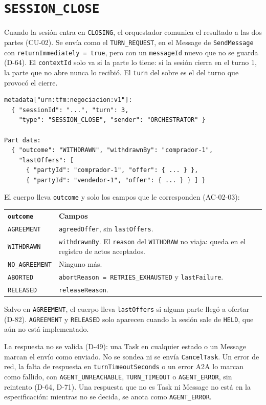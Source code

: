 \section{\texttt{SESSION\_CLOSE}}

Cuando la sesión entra en \texttt{CLOSING}, el orquestador comunica el resultado a las dos partes (CU-02). Se envía como el \texttt{TURN\_REQUEST}, en el Message de \texttt{SendMessage} con \texttt{returnImmediately = true}, pero con un \texttt{messageId} nuevo que no se guarda (D-64). El \texttt{contextId} solo va si la parte lo tiene: si la sesión cierra en el turno 1, la parte que no abre nunca lo recibió. El \texttt{turn} del sobre es el del turno que provocó el cierre.

\begin{verbatim}
metadata["urn:tfm:negociacion:v1"]:
  { "sessionId": "...", "turn": 3,
    "type": "SESSION_CLOSE", "sender": "ORCHESTRATOR" }

Part data:
  { "outcome": "WITHDRAWN", "withdrawnBy": "comprador-1",
    "lastOffers": [
      { "partyId": "comprador-1", "offer": { ... } },
      { "partyId": "vendedor-1", "offer": { ... } } ] }
\end{verbatim}

El cuerpo lleva \texttt{outcome} y solo los campos que le corresponden (AC-02-03):

\begin{tabular}{p{3.5cm}p{10cm}}
  \textbf{\texttt{outcome}} & \textbf{Campos} \\
  \texttt{AGREEMENT} & \texttt{agreedOffer}, sin \texttt{lastOffers}. \\
  \texttt{WITHDRAWN} & \texttt{withdrawnBy}. El \texttt{reason} del \texttt{WITHDRAW} no viaja: queda en el registro de actos aceptados. \\
  \texttt{NO\_AGREEMENT} & Ninguno más. \\
  \texttt{ABORTED} & \texttt{abortReason = RETRIES\_EXHAUSTED} y \texttt{lastFailure}. \\
  \texttt{RELEASED} & \texttt{releaseReason}. \\
\end{tabular}

Salvo en \texttt{AGREEMENT}, el cuerpo lleva \texttt{lastOffers} si alguna parte llegó a ofertar (D-82). \texttt{AGREEMENT} y \texttt{RELEASED} solo aparecen cuando la sesión sale de \texttt{HELD}, que aún no está implementado.

La respuesta no se valida (D-49): una Task en cualquier estado o un Message marcan el envío como enviado. No se sondea ni se envía \texttt{CancelTask}. Un error de red, la falta de respuesta en \texttt{turnTimeoutSeconds} o un error A2A lo marcan como fallido, con \texttt{AGENT\_UNREACHABLE}, \texttt{TURN\_TIMEOUT} o \texttt{AGENT\_ERROR}, sin reintento (D-64, D-71). Una respuesta que no es Task ni Message no está en la especificación: mientras no se decida, se anota como \texttt{AGENT\_ERROR}.
